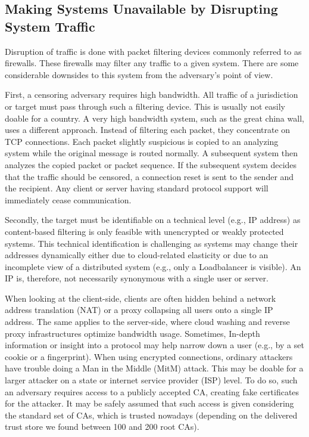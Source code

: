 \subsection{Making Systems Unavailable by Disrupting System Traffic}
Disruption of traffic is done with packet filtering devices commonly referred to as firewalls. These firewalls may filter any traffic to a given system. There are some considerable downsides to this system from the adversary's point of view.

First, a censoring adversary requires high bandwidth. All traffic of a jurisdiction or target must pass through such a filtering device. This is usually not easily doable for a country. A very high bandwidth system, such as the great china wall, uses a different approach. Instead of filtering each packet, they concentrate on TCP connections. Each packet slightly suspicious is copied to an analyzing system while the original message is routed normally. A subsequent system then analyzes the copied packet or packet sequence. If the subsequent system decides that the traffic should be censored, a connection reset is sent to the sender and the recipient. Any client or server having standard protocol support will immediately cease communication.

Secondly, the target must be identifiable on a technical level (e.g., IP address) as content-based filtering is only feasible with unencrypted or weakly protected systems. This technical identification is challenging as systems may change their addresses dynamically either due to cloud-related elasticity or due to an incomplete view of a distributed system (e.g., only a Loadbalancer is visible). An IP is, therefore, not necessarily synonymous with a single user or server. 

When looking at the client-side, clients are often hidden behind a network address translation (NAT) or a proxy collapsing all users onto a single IP address. The same applies to the server-side, where cloud washing and reverse proxy infrastructures optimize bandwidth usage. Sometimes, In-depth information or insight into a protocol may help narrow down a user (e.g., by a set cookie or a fingerprint). When using encrypted connections, ordinary attackers have trouble doing a Man in the Middle (MitM) attack. This may be doable for a larger attacker on a state or internet service provider (ISP) level. To do so, such an adversary requires access to a publicly accepted CA, creating fake certificates for the attacker. It may be safely assumed that such access is given considering the standard set of CAs, which is trusted nowadays (depending on the delivered trust store we found between 100 and 200 root CAs).

